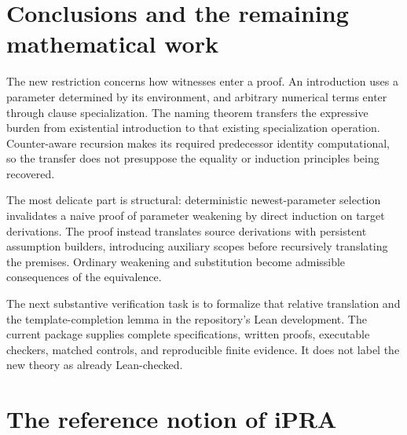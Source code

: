 \documentclass[11pt]{article}
\theoremstyle{definition}\newtheorem{definition}[theorem]{Definition}
\theoremstyle{remark}\newtheorem{remark}[theorem]{Remark}
\begin{document}
\section{Conclusions and the remaining mathematical work}

The new restriction concerns how witnesses enter a proof. An introduction
uses a parameter determined by its environment, and arbitrary numerical
terms enter through clause specialization. The naming theorem transfers
the expressive burden from existential introduction to that existing
specialization operation. Counter-aware recursion makes its required
predecessor identity computational, so the transfer does not presuppose
the equality or induction principles being recovered.

The most delicate part is structural: deterministic newest-parameter
selection invalidates a naive proof of parameter weakening by direct
induction on target derivations. The proof instead translates source
derivations with persistent assumption builders, introducing auxiliary
scopes before recursively translating the premises. Ordinary weakening
and substitution become admissible consequences of the equivalence.

The next substantive verification task is to formalize that relative
translation and the template-completion lemma in the repository's Lean
development. The current package supplies complete specifications,
written proofs, executable checkers, matched controls, and reproducible
finite evidence. It does not label the new theory as already Lean-checked.

\appendix
\section{The reference notion of iPRA}
\end{document}
